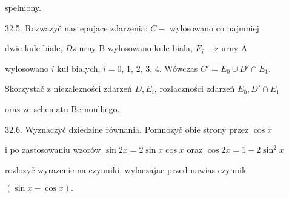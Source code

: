 \documentclass[a4paper,12pt]{article}
\begin{document}
spelniony.

32.5. Rozwazyč nastepujace zdarzenia: $C -$ wylosowano co najmniej

dwie kule biale, $D \mathrm{z}$ urny $\mathrm{B}$ wylosowano kule biala, $E_{i} - \mathrm{z}$ urny $\mathrm{A}$

wylosowano $i$ kul bialych, $i=0$, 1, 2, 3, 4. Wówczas $C'=E_{0}\cup D'\cap E_{1}.$

Skorzystač $\mathrm{z}$ niezalezności zdarzeń $D, E_{i}$, rozlaczności zdarzeń $E_{0}, D'\cap E_{1}$

oraz ze schematu Bernoulliego.

32.6. Wyznaczyč dziedzine równania. Pomnozyč obie strony przez $\cos x$

$\mathrm{i}$ po zastosowaniu wzorów $\sin 2x = 2\sin x\cos x$ oraz $\cos 2x = 1-2\sin^{2}x$

rozlozyč wyrazenie na czynniki, wylaczajac przed nawias czynnik

$(\sin x-\cos x).$
\end{document}
